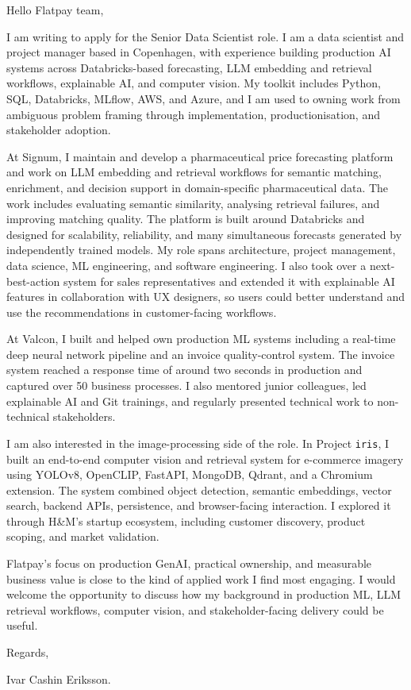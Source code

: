 \documentclass[11pt,a4paper]{moderncv}
\begin{document}
\makecvtitle
Hello Flatpay team,

\vspace*{2em}
I am writing to apply for the Senior Data Scientist role. I am a data scientist and project manager based in Copenhagen, with experience building production AI systems across Databricks-based forecasting, LLM embedding and retrieval workflows, explainable AI, and computer vision. My toolkit includes Python, SQL, Databricks, MLflow, AWS, and Azure, and I am used to owning work from ambiguous problem framing through implementation, productionisation, and stakeholder adoption.

\hspace*{2em}
At Signum, I maintain and develop a pharmaceutical price forecasting platform and work on LLM embedding and retrieval workflows for semantic matching, enrichment, and decision support in domain-specific pharmaceutical data. The work includes evaluating semantic similarity, analysing retrieval failures, and improving matching quality. The platform is built around Databricks and designed for scalability, reliability, and many simultaneous forecasts generated by independently trained models. My role spans architecture, project management, data science, ML engineering, and software engineering. I also took over a next-best-action system for sales representatives and extended it with explainable AI features in collaboration with UX designers, so users could better understand and use the recommendations in customer-facing workflows.

\hspace*{2em}
At Valcon, I built and helped own production ML systems including a real-time deep neural network pipeline and an invoice quality-control system. The invoice system reached a response time of around two seconds in production and captured over 50 business processes. I also mentored junior colleagues, led explainable AI and Git trainings, and regularly presented technical work to non-technical stakeholders.

\hspace*{2em}
I am also interested in the image-processing side of the role. In Project \texttt{iris}, I built an end-to-end computer vision and retrieval system for e-commerce imagery using YOLOv8, OpenCLIP, FastAPI, MongoDB, Qdrant, and a Chromium extension. The system combined object detection, semantic embeddings, vector search, backend APIs, persistence, and browser-facing interaction. I explored it through H\&M's startup ecosystem, including customer discovery, product scoping, and market validation.

\vspace*{2em}
Flatpay's focus on production GenAI, practical ownership, and measurable business value is close to the kind of applied work I find most engaging. I would welcome the opportunity to discuss how my background in production ML, LLM retrieval workflows, computer vision, and stakeholder-facing delivery could be useful.

\vspace*{1em}
Regards,

Ivar Cashin Eriksson.
\end{document}
